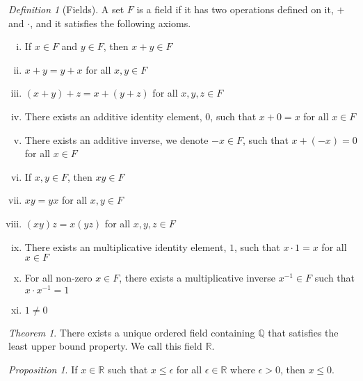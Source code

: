 \documentclass{article}
\theoremstyle{theorem}
\theoremstyle{definition}
\theoremstyle{proposition}
\theoremstyle{remark}
\newtheorem{theorem}{Theorem}[section]
\newtheorem{definition}{Definition}[section]
\newtheorem{proposition}{Proposition}[section]
\begin{document}
\begin{definition}[Fields]
   A set $F$  is a field if it has two operations defined on it, $+$ and $\cdot$, and it satisfies the following axioms.
   \begin{enumerate}[(i)]
       \item If $x \in F$ and $y \in F$, then $x + y \in F$
       \item $x + y = y + x$ for all $x,y \in F$
       \item $(x + y) + z = x + (y + z)$ for all $x,y,z \in F$
       \item There exists an additive identity element, $0$, such that $x + 0 = x$ for all $x \in F$
       \item There exists an additive inverse, we denote $-x \in F$, such that $x + (-x) = 0$ for all $x \in F$
       \item If $x,y \in F$, then $xy \in F$
       \item $xy = yx $ for all $x,y \in F$
       \item $(xy)z = x(yz)$ for all $x,y,z \in F$
       \item There exists an multiplicative identity element, $1$, such that $x \cdot 1 = x$ for all $x \in F$
       \item For all non-zero $x\in F$, there exists a multiplicative inverse $x^{-1} \in F$ such that $x\cdot x^{-1} = 1$
       \item $1 \neq 0$
   \end{enumerate}
\end{definition}
\begin{theorem}
   There exists a unique ordered field containing $\mathbb{Q}$  that satisfies the least upper bound property. We call this field $\mathbb{R}$.
\end{theorem}
\begin{proposition}
    If $x \in \mathbb{R}$ such that $x \leq \epsilon$ for all $\epsilon \in \mathbb{R}$ where $\epsilon > 0$, then $x \leq 0$.
\end{proposition}
\end{document}
